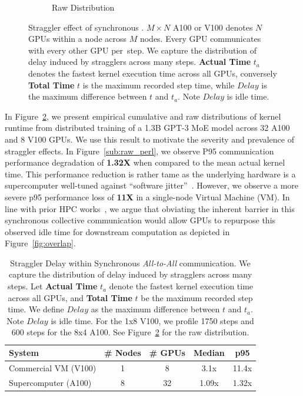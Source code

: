\begin{figure}[!h]
\begin{subfigure}{0.4\textwidth}
        \caption{Raw Distribution}
        \label{sub:raw_az}
    \end{subfigure}
    \caption{Straggler effect of synchronous \alltoall. $M\times N$ A100 or V100 denotes
        $N$ GPUs within a node across $M$ nodes.
        Every GPU communicates with every other GPU per~\alltoall step.
        We capture the distribution of delay induced by stragglers across many steps.
        \textbf{Actual Time} $t_a$ denotes the fastest kernel execution time across all GPUs,
        conversely \textbf{Total Time} $t$ is the maximum recorded step time, while
        $Delay$ is the maximum difference between $t$ and $t_a$. Note $Delay$ is idle time.}
    \label{fig:straggler}
\end{figure}
In Figure~\ref{fig:straggler}, we present empirical cumulative and raw distributions of
\alltoall kernel runtime from distributed training of a 1.3B GPT-3 MoE model across
32 A100 and 8 V100 GPUs. We use this result to motivate the severity and prevalence of straggler effects.
In Figure~\ref{sub:raw_perl}, we observe P95
communication performance degradation of \textbf{1.32X} when compared to the mean actual kernel time.
This performance reduction is rather tame as the underlying hardware is a supercomputer well-tuned
against ``software jitter''~\cite{nerscNetworkNERSC}.
However, we observe a more severe p95 performance loss of \textbf{11X} in a single-node Virtual Machine (VM).
In line with prior HPC works~\cite{1639320, 10.1145/3545008.3545056},
we argue that obviating the inherent barrier in this synchronous collective communication would
allow GPUs to repurpose this observed idle time for downstream computation as depicted in Figure~\ref{fig:overlap}.
\begin{table}[!h]
    \centering
    \caption{Straggler Delay within Synchronous \emph{All-to-All} communication.
    We capture the distribution of delay induced by stragglers across many steps.
    Let \textbf{Actual Time} $t_a$ denote the fastest kernel execution time across all GPUs,
        and \textbf{Total Time} $t$ be the maximum recorded step time. We define
        $Delay$ as the maximum difference between $t$ and $t_a$. Note $Delay$ is idle time. For the
        1x8 V100, we profile 1750 steps and 600 steps for the 8x4 A100. See Figure~\ref{fig:straggler}
        for the raw distribution.}
    \label{tab:s_delays}
    \begin{tabular}{@{}lcccc@{}}
        \toprule
        \textbf{System}      & \multicolumn{1}{l}{\textbf{\# Nodes}} & \multicolumn{1}{l}{\textbf{\# GPUs}} & \textbf{Median} & \textbf{p95} \\ \midrule
        Commercial VM (V100) & 1                                     & 8                                    & 3.1x            & 11.4x        \\
        Supercomputer (A100) & 8                                     & 32                                   & 1.09x           & 1.32x        \\ \bottomrule
    \end{tabular}
\end{table}
